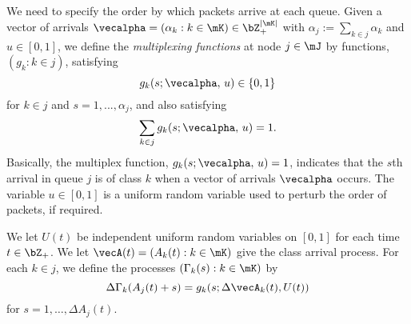 \documentclass{amsart}
\begin{document}
We need to specify the order by which packets arrive at each queue. Given a vector of arrivals $\vecalpha = (\alpha_k: k\in \mK)\in\bZ_+^{|\mK|}$ with $\alpha_j:=\sum_{k\in j} \alpha_k$ and $u\in [0,1]$, we define the \emph{multiplexing functions} at node $j\in\mJ$ by functions, $(g_k : k \in j)$,  satisfying
\begin{equation*}
g_k(s ; \vecalpha, \, u) \in \{ 0, 1 \}
\end{equation*}
for $k \in j$ and $s = 1, ..., \alpha_{j}$, and also satisfying
\begin{equation*}
\sum_{k\in j} g_k(s ; \vecalpha, \, u) =1.
\end{equation*}
Basically, the multiplex function, $g_k(s ; \vecalpha, \, u)=1$, indicates that the $s$th arrival in queue $j$ is of class $k$ when a vector of arrivals $\vecalpha$ occurs. The variable $u\in [0,1]$ is a uniform random variable used to perturb the order of packets, if required.

We let $U(t)$ be independent uniform random variables on $[0,1]$ for each time $t\in\bZ_+$. We let $\vecA(t)=(A_k(t) : k\in \mK)$ give the class arrival process. For each $k\in j$, we define the processes $(\Gamma_k(s): k\in\mK)$ by
\begin{equation}\label{multiplex}
\Delta\Gamma_k(A_j(t) + s)= g_k(s; \Delta \vecA_k(t), U(t))
\end{equation}
for $s=1,\ldots,\Delta A_j(t)$.

\iffalse
that returns a vector of size $k_j$, indexed by $k \in j$.
The $k$-th component of such vector is a non-decreasing function,
\begin{equation}
g_k((a_k, k\in j), \, \xi; \,s) \in \bN  \quad  s = 0,1, \ldots, |a|
\end{equation}
such that $\sum_{k \in j} f_k(\ldots;\,s) =s$ and $f_k(\ldots; \, |a|)=a_k$.

The Markovian evolution of the network is defined as follows.

The total number of served packets at time $t$ and at node $j\in\mJ$ are given by
\begin{equation}
D_j(t) =  D_j(t-1) + \vecsigma_{j(k)}(\vecQ(t-1))
\end{equation}
and the ones of class $k\in j$ are
\begin{equation}
D_k(t) = D_k(t-1) + \Gamma(D_{j(k)}(t)) -  \Gamma(D_{j(k)}(t-1)) \ .
\end{equation}
For $k\in\mK^i$, set
\begin{equation}
A_k(t) = A_k(t-1) + \Theta_k(t)
\end{equation}
where $(\Theta_k(t), t>0)$ is a sequence of i.i.d. random variables with mean $a_{r(k)}$
and for  $k\in\mK\setminus\mK^i$  set
\begin{equation}
A_k(t) = A_k(t-1) + D_{b(k)}(t) -  D_{b(k)}(t-1) \ .
\end{equation}
Let, for $j\in\mJ$
\begin{equation}
A_j(t) = \sum_{k \in j} A_k(t)
\end{equation}
\fi
\end{document}
